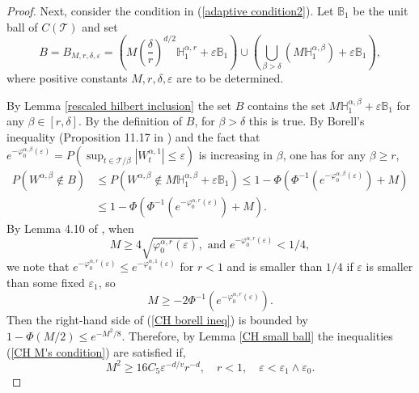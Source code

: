 \documentclass[ejs,noshowframe]{imsart}
\theoremstyle{plain}
\theoremstyle{definition}
\theoremstyle{remark}
\begin{document}
\begin{appendix}
\begin{proof}
Next, consider the condition in (\ref{adaptive condition2}). Let
$\mathbb{B}_1$ be the unit ball of $C(\mathcal{T})$ and set
\begin{equation}
B=B_{M, r, \delta, \varepsilon}=\left(M ({\frac{\delta}{r}})^{d/2} \mathbb{H}_1^{\alpha,r}+\varepsilon \mathbb{B}_1\right) \cup\left(\bigcup_{{\beta} > \delta}\left(M \mathbb{H}_1^{\alpha,\beta}\right)+\varepsilon \mathbb{B}_1\right),
\end{equation}
 where positive constants $M, r, \delta, \varepsilon$ are to be determined.

By Lemma \ref{rescaled hilbert inclusion} the set $B$ contains the set $M \mathbb{H}_1^{\alpha,\beta}+\varepsilon \mathbb{B}_1$ for any ${\beta} \in[r, \delta]$. By the definition of $B$,  for ${\beta}>\delta$  this is true. By Borell's inequality (Proposition 11.17 in \cite{ghosal2017fundamentals}) and the fact that $e^{-\varphi_0^{\alpha,\beta}(\varepsilon)}=P\left(\sup _{t \in \mathcal{T}/\beta}\left|W^{\alpha,1}_t\right| \leq \varepsilon\right)$ is increasing in ${\beta}$,  one has for any ${\beta} \geq r$,
\begin{equation}\label{CH borell ineq}
\begin{aligned}
P\left(W^{\alpha,\beta} \notin B\right) & \leq P\left(W^{\alpha,\beta} \notin M \mathbb{H}_1^{\alpha,\beta}+\varepsilon \mathbb{B}_1\right) \leq 1-\Phi\left(\Phi^{-1}\left(e^{-\varphi_0^{\alpha,\beta}(\varepsilon)}\right)+M\right) \\
& \leq 1-\Phi\left(\Phi^{-1}\left(e^{-\varphi_0^{\alpha,r}(\varepsilon)}\right)+M\right).
\end{aligned}
\end{equation}
By Lemma 4.10 of \cite{van2009adaptive}, when 
\begin{equation} \label{CH M's condition}
M \geq 4 \sqrt{\varphi_0^{\alpha,r}(\varepsilon)}, \text { and } e^{-\varphi_0^{\alpha,r}(\varepsilon)}<1 / 4 ,
\end{equation}
we note that $e^{-\varphi_0^{\alpha,r}(\varepsilon)} \leq e^{-\varphi_0^{\alpha,1}(\varepsilon)}$ for $r<1$ and is  smaller than $1 / 4$ if $\varepsilon$ is smaller than some fixed $\varepsilon_1$, so  
$$
M \geq-2 \Phi^{-1}\left(e^{-\varphi_0^{\alpha,r}(\varepsilon)}\right).
$$
Then the right-hand side of (\ref{CH borell ineq}) is bounded by $1-\Phi(M / 2) \leq e^{-M^2 / 8}$. Therefore, by Lemma \ref{CH small ball} the inequalities (\ref{CH M's condition})  are satisfied if,
\begin{equation}\label{CH M range}
M^2 \geq 16 C_5 \varepsilon^{-d/v} r^{-d}, \quad r<1, \quad \varepsilon<\varepsilon_1 \wedge \varepsilon_0 .

\end{equation}
\end{proof}
\end{appendix}
\end{document}
